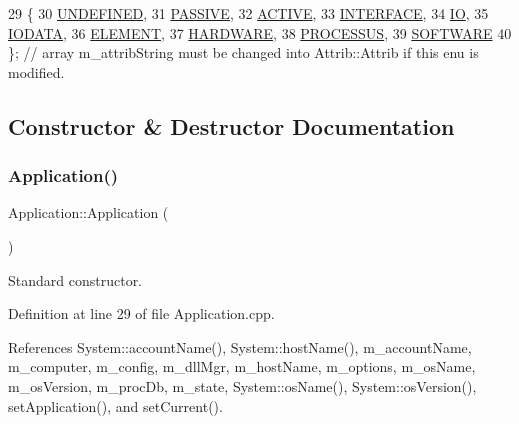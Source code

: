 \begin{DoxyCode}
29                 \{
30     \hyperlink{classAttrib_a69e171d7cc6417835a5a306d3c764235a3a8da2ab97dda18aebab196fe4100531}{UNDEFINED},
31     \hyperlink{classAttrib_a69e171d7cc6417835a5a306d3c764235a2bfb2af57b87031d190a05fe25dd92ed}{PASSIVE},
32     \hyperlink{classAttrib_a69e171d7cc6417835a5a306d3c764235a3b1fec929c0370d1436f2f06e298fb0d}{ACTIVE},
33     \hyperlink{classAttrib_a69e171d7cc6417835a5a306d3c764235aa27c16b480a369ea4d18b07b2516bbc7}{INTERFACE},
34     \hyperlink{classAttrib_a69e171d7cc6417835a5a306d3c764235a1420a5b8c0540b2af210b6975eded7f9}{IO},
35     \hyperlink{classAttrib_a69e171d7cc6417835a5a306d3c764235a0af3b0d0ac323c1704e6c69cf90add28}{IODATA},
36     \hyperlink{classAttrib_a69e171d7cc6417835a5a306d3c764235a7788bc5dd333fd8ce18562b269c9dab1}{ELEMENT},
37     \hyperlink{classAttrib_a69e171d7cc6417835a5a306d3c764235a61ceb22149f365f1780d18f9d1459423}{HARDWARE},
38     \hyperlink{classAttrib_a69e171d7cc6417835a5a306d3c764235a75250e29692496e73effca2c0330977f}{PROCESSUS},
39     \hyperlink{classAttrib_a69e171d7cc6417835a5a306d3c764235a103a67cd0b8f07ef478fa45d4356e27b}{SOFTWARE} 
40   \}; \textcolor{comment}{// array m\_attribString must be changed into Attrib::Attrib if this enu is modified. }
\end{DoxyCode}


\subsection{Constructor \& Destructor Documentation}
\mbox{\label{classApplication_afa8cc05ce6b6092be5ecdfdae44e05f8}} 
\subsubsection{\texorpdfstring{Application()}{Application()}}
{\footnotesize\ttfamily Application\+::\+Application (\begin{DoxyParamCaption}{ }\end{DoxyParamCaption})}



Standard constructor. 



Definition at line 29 of file Application.\+cpp.



References System\+::account\+Name(), System\+::host\+Name(), m\+\_\+account\+Name, m\+\_\+computer, m\+\_\+config, m\+\_\+dll\+Mgr, m\+\_\+host\+Name, m\+\_\+options, m\+\_\+os\+Name, m\+\_\+os\+Version, m\+\_\+proc\+Db, m\+\_\+state, System\+::os\+Name(), System\+::os\+Version(), set\+Application(), and set\+Current().


